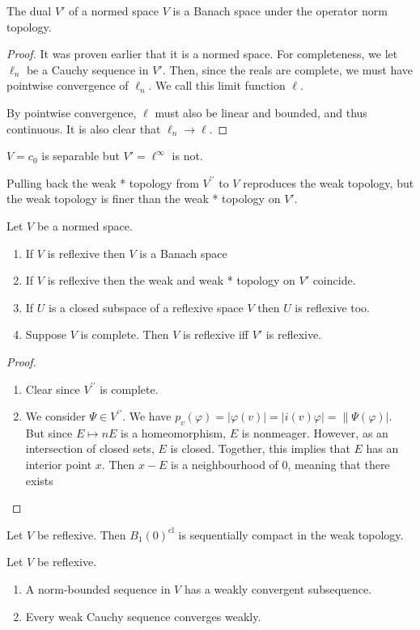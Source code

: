 \documentclass[twoside,symmetric, openany, 12pt]{./tuftebook}
\theoremstyle{definition}
\theoremstyle{definition}
\theoremstyle{definition}
\newenvironment{parts}{\begin{enumerate}[label=(\alph*)]}{\end{enumerate}}
\begin{document}
\begin{Theorem}
	The dual $V'$ of a normed space $V$ is a Banach space under the operator norm topology.
\end{Theorem}
\begin{proof}
	It was proven earlier that it is a normed space. For completeness, we let $\ell_n$ be a Cauchy sequence in $V'$. Then, since the reals are complete, we must have pointwise convergence of $\ell_n$. We call this limit function $\ell$.
	
	By pointwise convergence, $\ell$ must also be linear and bounded, and thus continuous. It is also clear that $\ell_n\to \ell$. 
\end{proof}
\begin{Example}
	$V=c_0$ is separable but $V'=\ell^\infty$ is not.
\end{Example}
\begin{Theorem}
	Pulling back the weak * topology from $V^{\prime\prime}$ to $V$ reproduces the weak topology, but the weak topology is finer than the weak * topology on $V'$.
\end{Theorem}
\begin{Theorem}
	Let $V$ be a normed space.
	\begin{parts}
		\item If $V$ is reflexive then $V$ is a Banach space
		\item If $V$ is reflexive then the weak and weak * topology on $V'$ coincide.
		\item If $U$ is a closed subspace of a reflexive space $V$ then $U$ is reflexive too.
		\item Suppose $V$ is complete. Then $V$ is reflexive iff $V'$ is reflexive.
	\end{parts}
\end{Theorem}
\begin{proof}
	\begin{parts}
		\item Clear since $V^{\prime\prime}$ is complete.
		\item We consider $\Psi\in V^{\prime\prime}$. We have $p_v(\varphi)=|\varphi(v)| = |i(v)\varphi|=\|\Psi(\varphi)|$. But since $E\mapsto n E$ is a homeomorphism, $E$ is nonmeager. However, as an intersection of closed sets, $E$ is closed. Together, this implies that $E$ has an interior point $x$. Then $x-E$ is a neighbourhood of 0, meaning that there exists 
	\end{parts}
\end{proof}
\begin{Theorem}
	Let $V$ be reflexive. Then $B_1(0)^\text{cl}$ is sequentially compact in the weak topology.
\end{Theorem}
\begin{Corollary}
	Let $V$ be reflexive.
	\begin{parts}
		\item A norm-bounded sequence in $V$ has a weakly convergent subsequence.
		\item Every weak Cauchy sequence converges weakly.
	\end{parts}
\end{Corollary}
\end{document}
